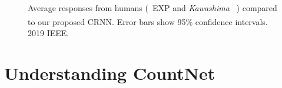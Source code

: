 \begin{figure}[t!]
   \centering
   \begin{adjustbox}{width=0.7\columnwidth}
     
   \end{adjustbox}
   \caption{Average responses from humans (\
   {EXP} and \emph{Kawashima}
~\cite{kawashima15}) compared to our proposed CRNN. Error bars show 95\% confidence intervals. \textsuperscript{\textregistered}2019 IEEE.}%
   \label{fig:experiment}
\end{figure}

\section{Understanding CountNet}%
\label{sec:ablation}
\begin{figure}[t]
  \centering

\end{figure}
